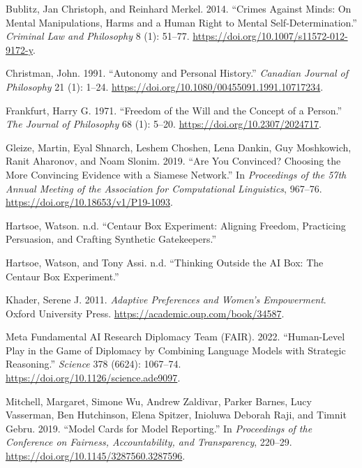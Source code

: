 \documentclass[
  10.5pt,
  letterpaper,
]{article}
\newlength{\cslhangindent}
\newenvironment{CSLReferences}[2] %
 {\begin{list}{}{%
  \setlength{\itemindent}{0pt}
  \setlength{\leftmargin}{0pt}
  \setlength{\parsep}{0pt}
  \ifodd #1
   \setlength{\leftmargin}{\cslhangindent}
   \setlength{\itemindent}{-1\cslhangindent}
  \fi
  \setlength{\itemsep}{#2\baselineskip}}}
 {\end{list}}
\begin{document}
\label{refs}
\begin{CSLReferences}{1}{0}
Bublitz, Jan Christoph, and Reinhard Merkel. 2014. {``Crimes Against
Minds: On Mental Manipulations, Harms and a Human Right to Mental
Self-Determination.''} \emph{Criminal Law and Philosophy} 8 (1): 51--77.
\url{https://doi.org/10.1007/s11572-012-9172-y}.

Christman, John. 1991. {``Autonomy and Personal History.''}
\emph{Canadian Journal of Philosophy} 21 (1): 1--24.
\url{https://doi.org/10.1080/00455091.1991.10717234}.

Frankfurt, Harry G. 1971. {``Freedom of the Will and the Concept of a
Person.''} \emph{The Journal of Philosophy} 68 (1): 5--20.
\url{https://doi.org/10.2307/2024717}.

Gleize, Martin, Eyal Shnarch, Leshem Choshen, Lena Dankin, Guy
Moshkowich, Ranit Aharonov, and Noam Slonim. 2019. {``Are You Convinced?
Choosing the More Convincing Evidence with a Siamese Network.''} In
\emph{Proceedings of the 57th Annual Meeting of the Association for
Computational Linguistics}, 967--76.
\url{https://doi.org/10.18653/v1/P19-1093}.

Hartsoe, Watson. n.d. {``Centaur Box Experiment: Aligning Freedom,
Practicing Persuasion, and Crafting Synthetic Gatekeepers.''}

Hartsoe, Watson, and Tony Assi. n.d. {``Thinking Outside the AI Box: The
Centaur Box Experiment.''}

Khader, Serene J. 2011. \emph{Adaptive Preferences and Women's
Empowerment}. Oxford University Press.
\url{https://academic.oup.com/book/34587}.

Meta Fundamental AI Research Diplomacy Team (FAIR). 2022. {``Human-Level
Play in the Game of Diplomacy by Combining Language Models with
Strategic Reasoning.''} \emph{Science} 378 (6624): 1067--74.
\url{https://doi.org/10.1126/science.ade9097}.

Mitchell, Margaret, Simone Wu, Andrew Zaldivar, Parker Barnes, Lucy
Vasserman, Ben Hutchinson, Elena Spitzer, Inioluwa Deborah Raji, and
Timnit Gebru. 2019. {``Model Cards for Model Reporting.''} In
\emph{Proceedings of the Conference on Fairness, Accountability, and
Transparency}, 220--29. \url{https://doi.org/10.1145/3287560.3287596}.


\end{CSLReferences}
\end{document}
